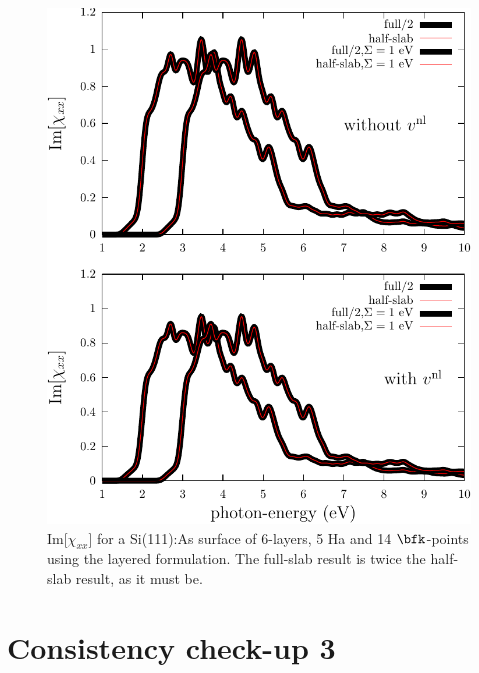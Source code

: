 \begin{figure}[b]
\centering
\includegraphics[scale=.7]{figures/plots/surface-chi}
\caption{Im[$\chi_{xx}$] 
for a Si(111):As surface of 6-layers, 5 Ha and 14 $\bfk$-points using
the layered formulation. 
The full-slab result is twice the half-slab
result, as it must be.
}
\label{si111as}
\end{figure}

\section{Consistency check-up 3}

